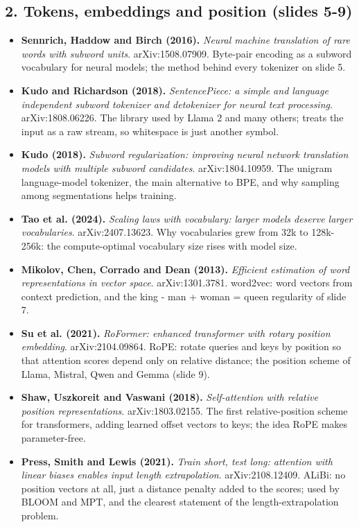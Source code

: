 \documentclass[11pt,letterpaper]{article}
\begin{document}
\subsection*{2. Tokens, embeddings and position (slides 5-9)}
\begin{itemize}[leftmargin=1.2em,itemsep=3pt]\sloppy
\item \textbf{Sennrich, Haddow and Birch (2016).} \textit{Neural machine translation of rare words with subword units}. arXiv:1508.07909. Byte-pair encoding as a subword vocabulary for neural models; the method behind every tokenizer on slide 5.
\item \textbf{Kudo and Richardson (2018).} \textit{SentencePiece: a simple and language independent subword tokenizer and detokenizer for neural text processing}. arXiv:1808.06226. The library used by Llama 2 and many others; treats the input as a raw stream, so whitespace is just another symbol.
\item \textbf{Kudo (2018).} \textit{Subword regularization: improving neural network translation models with multiple subword candidates}. arXiv:1804.10959. The unigram language-model tokenizer, the main alternative to BPE, and why sampling among segmentations helps training.
\item \textbf{Tao et al. (2024).} \textit{Scaling laws with vocabulary: larger models deserve larger vocabularies}. arXiv:2407.13623. Why vocabularies grew from 32k to 128k-256k: the compute-optimal vocabulary size rises with model size.
\item \textbf{Mikolov, Chen, Corrado and Dean (2013).} \textit{Efficient estimation of word representations in vector space}. arXiv:1301.3781. word2vec: word vectors from context prediction, and the king - man + woman = queen regularity of slide 7.
\item \textbf{Su et al. (2021).} \textit{RoFormer: enhanced transformer with rotary position embedding}. arXiv:2104.09864. RoPE: rotate queries and keys by position so that attention scores depend only on relative distance; the position scheme of Llama, Mistral, Qwen and Gemma (slide 9).
\item \textbf{Shaw, Uszkoreit and Vaswani (2018).} \textit{Self-attention with relative position representations}. arXiv:1803.02155. The first relative-position scheme for transformers, adding learned offset vectors to keys; the idea RoPE makes parameter-free.
\item \textbf{Press, Smith and Lewis (2021).} \textit{Train short, test long: attention with linear biases enables input length extrapolation}. arXiv:2108.12409. ALiBi: no position vectors at all, just a distance penalty added to the scores; used by BLOOM and MPT, and the clearest statement of the length-extrapolation problem.

\end{itemize}
\end{document}
